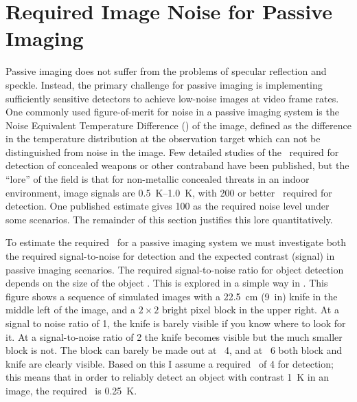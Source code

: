 
\section{Required Image Noise for Passive Imaging} \label{sec:ch1-netd-reqs}

Passive imaging does not suffer from the problems of specular reflection and speckle.
Instead, the primary challenge for passive imaging is implementing sufficiently sensitive detectors to achieve low-noise images at video frame rates.
One commonly used figure-of-merit for noise in a passive imaging system is the Noise Equivalent Temperature Difference (\NETD) of the image, defined as the difference in the temperature distribution at the observation target which can not be distinguished from noise in the image.
Few detailed studies of the \NETD\ required for detection of concealed weapons or other contraband have been published, but the ``lore'' of the field is that for non-metallic concealed threats in an indoor environment, image signals are \SIrange{0.5}{1.0}{\K}, with \SI{200}{\mK} or  better \NETD\ required for detection.
One published estimate gives \SI{100}{\mK} as the required noise level \cite{salmon_scene_2004} under some scenarios.
The remainder of this section justifies this lore quantitatively.

To estimate the required \NETD\ for a passive imaging system we must investigate both the required signal-to-noise for detection and the expected contrast (signal) in passive imaging scenarios.
The required signal-to-noise ratio for object detection depends on the size of the object \cite{steven_w._smith_scientist_1997}.
This is explored in a simple way in .
This figure shows a sequence of simulated images with a \SI{22.5}{\cm} (\SI{9}{in}) knife in the middle left of the image, and a $2\times2$ bright pixel block in the upper right.
At a signal to noise ratio of 1, the knife is barely visible if you know where to look for it.
At a signal-to-noise ratio of 2 the knife becomes visible but the much smaller block is not.
The block can barely be made out at \SN\ 4, and at \SN\ 6 both block and knife are clearly visible.
Based on this I assume a required \SN\  of 4 for detection; this means that in order to reliably detect an object with contrast \SI{1}{\K} in an image, the required \NETD\ is \SI{0.25}{\K}.

